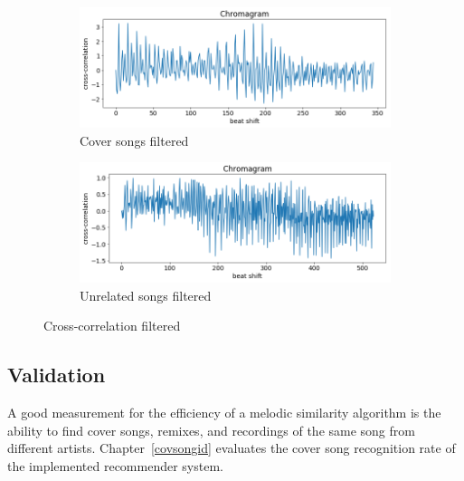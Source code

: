 \begin{figure}[htbp]
{{%
			\begin{subfigure}{.495\textwidth}
				\centering    
				\includegraphics[scale=0.3]{Images/Chroma/beatalignedchroma_corr_mean_filt.png}
				\caption{Cover songs filtered}
				\label{ccf3}
			\end{subfigure}		
			\begin{subfigure}{.495\textwidth}
				\centering     
				\includegraphics[scale=0.3]{Images/Chroma/beatalignedchroma_corr_mean2_filt.png}
				\caption{Unrelated songs filtered}
				\label{ccf4}
			\end{subfigure}%
	}}
	\caption{Cross-correlation filtered}
	\label{fig:crosscorr3}
\end{figure}
\FloatBarrier

\subsection{Validation}\label{chromavalid}
A good measurement for the efficiency of a melodic similarity algorithm is the ability to find cover songs, remixes, and recordings of the same song from different artists. Chapter~\ref{covsongid} evaluates the cover song recognition rate of the implemented recommender system. 
